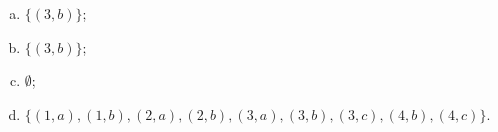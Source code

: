 {
\begin{enumerate}[(a)]
\item $\{(3,b)\}$;
\item $\{(3,b) \}$;
\item $\emptyset$;
\item $\{(1,a),(1,b),(2,a),(2,b),(3,a),(3,b),(3,c),(4,b),(4,c) \}$.
\end{enumerate}



}
